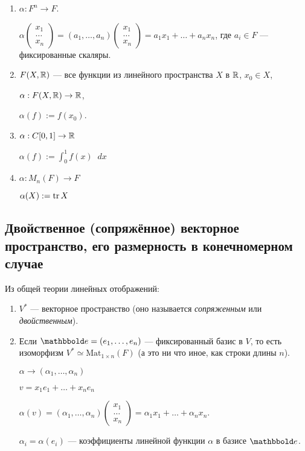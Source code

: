 \begin{enumerate}
\item $\alpha : F^n \to F$.

    $\alpha \begin{pmatrix} x_1 \\ \dots \\ x_n \end{pmatrix} = (a_1, \dots, a_n) \begin{pmatrix} x_1 \\ \dots \\ x_n \end{pmatrix} = a_1 x_1 + \dots + a_n x_n$, где $a_i \in F$ --- фиксированные скаляры.

\item $F(X, \mathbb{R})$ --- все функции из линейного пространства $X$ в $\mathbb{R}$, $x_0 \in X$,

    $\alpha : F(X, \mathbb{R}) \to \mathbb{R}$,

    $\alpha(f) := f(x_0)$.

\item $\alpha : C[0, 1] \to \mathbb{R}$

    $\alpha(f) := \displaystyle\int_0^1 f(x) \mathop{}\!d x$

\item $\alpha : M_n(F) \to F$

    $\alpha(X) := \operatorname{\mathop{\mathrm{tr}}} X$
\end{enumerate}

\subsection{Двойственное (сопряжённое) векторное пространство, его размерность в конечномерном случае}

Из общей теории линейных отображений:
\begin{enumerate}
\item $V^{*}$ --- векторное пространство (оно называется \textit{сопряженным} или \textit{двойственным}).
\item Если $\E = (e_1, \dots, e_n)$ --- фиксированный базис в $V$, то есть изоморфизм $V^{*} \simeq \text{Mat}_{1 \times n}(F)$ (а это ни что иное, как строки длины $n$).

    $\alpha \to (\alpha_1, \dots, \alpha_n)$

    $v = x_1 e_1 + \dots + x_n e_n$

    $\alpha(v) = (\alpha_1, \dots, \alpha_n) \begin{pmatrix} x_1 \\ \dots \\ x_n \end{pmatrix} = \alpha_1 x_1 + \dots + \alpha_n x_n$.

    $\alpha_i = \alpha(e_i)$ --- коэффициенты линейной функции $\alpha$ в базисе $\E$.
\end{enumerate}

